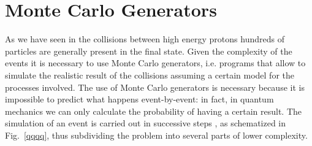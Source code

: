 \chapter{Monte Carlo Generators}
\thispagestyle{empty}

As we have seen in the collisions between high energy protons hundreds of particles are generally present in the final state.
Given the complexity of the events it is necessary to use Monte Carlo generators, i.e. programs that allow to simulate the realistic result of the collisions assuming a certain model for the processes involved. 
The use of Monte Carlo generators is necessary because it is impossible to predict what happens event-by-event: in fact,  in quantum mechanics we can only calculate the probability of having a certain result.
The simulation of an event is carried out in successive steps \cite{Sjostrand:2006su, Buckley:2011ms}, as schematized in Fig.~\ref{qqqq}, thus subdividing the problem into several parts of lower complexity.


